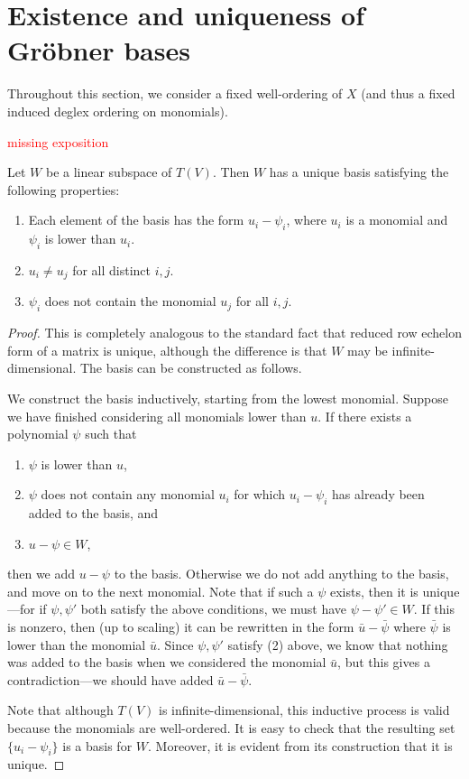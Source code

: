 \section{Existence and uniqueness of Gr\"obner bases}\label{sec:rref}
Throughout this section, we consider a fixed well-ordering of $X$ (and thus a fixed induced deglex ordering on monomials).

\textcolor{red}{missing exposition}

\begin{prop}\label{prop:rref}
	Let $W$ be a linear subspace of $T(V)$. Then $W$ has a unique basis satisfying the following properties:
	\begin{enumerate}
		\item Each element of the basis has the form $u_i - \psi_i$, where $u_i$ is a monomial and $\psi_i$ is lower than $u_i$.
		\item $u_i \neq u_j$ for all distinct $i,j$.
		\item $\psi_i$ does not contain the monomial $u_j$ for all $i,j$.
	\end{enumerate}
\end{prop}
\begin{proof}
	This is completely analogous to the standard fact that reduced row echelon form of a matrix is unique, although the difference is that $W$ may be infinite-dimensional. The basis can be constructed as follows.
	
	We construct the basis inductively, starting from the lowest monomial. Suppose we have finished considering all monomials lower than $u$. If there exists a polynomial $\psi$ such that
	\begin{enumerate}
		\item $\psi$ is lower than $u$,
		\item $\psi$ does not contain any monomial $u_i$ for which $u_i - \psi_i$ has already been added to the basis, and
		\item $u - \psi \in W$,
	\end{enumerate}
	then we add $u - \psi$ to the basis. Otherwise we do not add anything to the basis, and move on to the next monomial. Note that if such a $\psi$ exists, then it is unique---for if $\psi,\psi'$ both satisfy the above conditions, we must have $\psi - \psi' \in W$. If this is nonzero, then (up to scaling) it can be rewritten in the form $\bar{u} - \bar{\psi}$ where $\bar{\psi}$ is lower than the monomial $\bar{u}$. Since $\psi, \psi'$ satisfy (2) above, we know that nothing was added to the basis when we considered the monomial $\bar{u}$, but this gives a contradiction---we should have added $\bar{u}-\bar{\psi}$.
	
	Note that although $T(V)$ is infinite-dimensional, this inductive process is valid because the monomials are well-ordered. It is easy to check that the resulting set $\{u_i - \psi_i\}$ is a basis for $W$. Moreover, it is evident from its construction that it is unique.
\end{proof}
